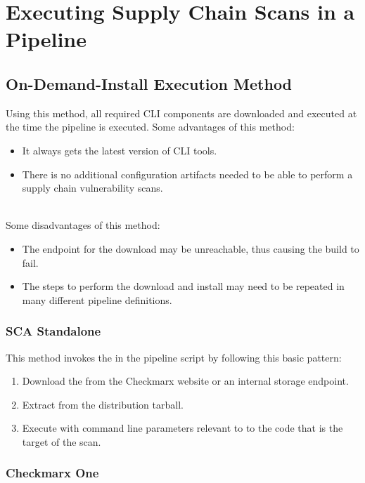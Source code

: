 \chapter{Executing Supply Chain Scans in a Pipeline}


\section{On-Demand-Install Execution Method}

Using this method, all required CLI components are downloaded and executed at the time
the pipeline is executed.  Some advantages of this method:


\begin{itemize}
    \item It always gets the latest version of CLI tools.
    \item There is no additional configuration artifacts needed to be able to
    perform a supply chain vulnerability scans.
\end{itemize}

\noindent\\Some disadvantages of this method:
\begin{itemize}
    \item The endpoint for the download may be unreachable, thus causing the build to fail.
    \item The steps to perform the download and install may need to be repeated
    in many different pipeline definitions.
\end{itemize}


\subsection{SCA Standalone}

This method invokes the \scaresolver in the pipeline script by following this
basic pattern:

\begin{enumerate}
    \item Download the \scaresolver from the Checkmarx website or
    an internal storage endpoint.
    \item Extract \scaresolver from the distribution tarball.
    \item Execute \scaresolver with command line parameters relevant to
    to the code that is the target of the scan.
\end{enumerate}


\subsection{Checkmarx One}


